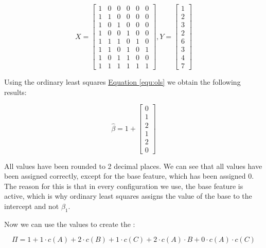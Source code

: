 \begin{displaymath}
    \textit{X} = 
    \begin{bmatrix} 
        1 & 0 & 0 & 0 & 0 & 0 \\
        1 & 1 & 0 & 0 & 0 & 0 \\
        1 & 0 & 1 & 0 & 0 & 0 \\
        1 & 0 & 0 & 1 & 0 & 0 \\
        1 & 1 & 1 & 0 & 1 & 0 \\
        1 & 1 & 0 & 1 & 0 & 1 \\
        1 & 0 & 1 & 1 & 0 & 0 \\
        1 & 1 & 1 & 1 & 1 & 1 
      \end{bmatrix}
      ,
      \textit{Y} =
      \begin{bmatrix}
        1 \\
        2 \\
        3 \\
        2 \\
        6 \\
        3 \\
        4 \\
        7 
      \end{bmatrix}
\end{displaymath}


Using the ordinary least squares \hyperref[equ:ols]{Equation \ref*{equ:ols}}  we obtain the following results:

\begin{equation}
    \hat{\beta} = 1 + 
    \begin{bmatrix}
        0 \\
        1 \\
        2 \\
        1 \\
        2 \\
        0
    \end{bmatrix}
\end{equation}

All values have been rounded to 2 decimal places. 
We can see that all values have been assigned correctly, except for the base feature, which has been assigned 0. The reason for this is that in every
configuration we use, the base feature is active, which is why ordinary least squares assigns the value of the base to the intercept and not $\beta_1$. 

Now we can use the values to create the \perfInfluenceModel:

\begin{equation}
    \Pi = 1 + 1 \cdot c(A) + 2 \cdot c(B) + 1 \cdot c(C) + 2 \cdot c(A) \cdot B + 0 \cdot c(A) \cdot c(C)
\end{equation}

